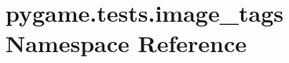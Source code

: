 \hypertarget{namespacepygame_1_1tests_1_1image__tags}{}\section{pygame.\+tests.\+image\+\_\+tags Namespace Reference}
\label{namespacepygame_1_1tests_1_1image__tags}
